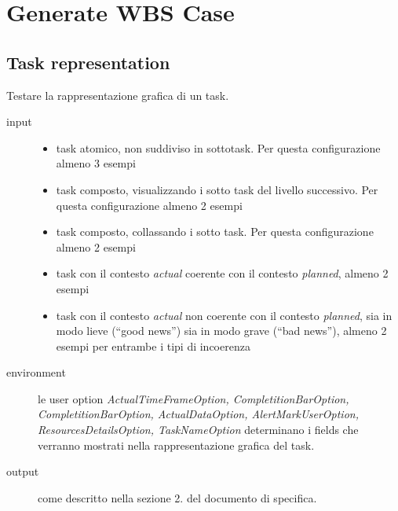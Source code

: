 \chapter{Generate WBS Case}
\label{chap:generateWBS}

\section{Task representation}
\label{sec:WBSTaskRepresentation}
Testare la rappresentazione grafica di un task.
\begin{description}
\item[input] 
\quad
\begin{itemize}
  \item task atomico, non suddiviso in sottotask. Per questa configurazione
  almeno 3 esempi
  \item task composto, visualizzando i sotto task del livello successivo. Per
  questa configurazione almeno 2 esempi
  \item task composto, collassando i sotto task.  Per questa configurazione
  almeno 2 esempi
  \item task con il contesto \emph{actual} coerente con il contesto
  \emph{planned}, almeno 2 esempi
  \item task con il contesto \emph{actual} non coerente con il contesto
  \emph{planned}, sia in modo lieve (``good news'') sia in modo grave (``bad
  news''), almeno 2 esempi per entrambe i tipi di incoerenza
\end{itemize}
\item[environment] le user option
\emph{ActualTimeFrameOption, CompletitionBarOption, CompletitionBarOption, 
ActualDataOption, AlertMarkUserOption, ResourcesDetailsOption, TaskNameOption}
determinano i fields che verranno mostrati nella rappresentazione grafica del task.
\item[output] come descritto nella sezione 2. del documento di specifica.
\end{description}

